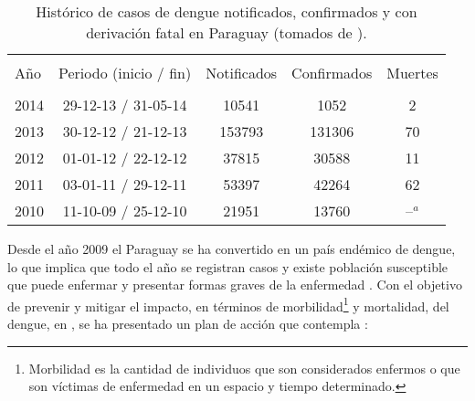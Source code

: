 \begin{table}
    \begin{minipage}{\textwidth}
        \begin{center}
        \caption{\label{tab:cap3-historico-casos-dengue} Histórico de casos de dengue notificados, confirmados y con derivación fatal en Paraguay (tomados de \citep{website:mspbsHistoria2014}).}
        \begin{tabular}{p{3cm} c c c c}
            \hline\\
            Año & Periodo (inicio / fin) & Notificados & Confirmados & Muertes\\
            \hline
            \hline\\
            2014 & 29-12-13 / 31-05-14 & 10541 & 1052 & 2\\
            2013 & 30-12-12 / 21-12-13 & 153793 & 131306 & 70\\
            2012 & 01-01-12 / 22-12-12 & 37815 & 30588 & 11\\
            2011 & 03-01-11 / 29-12-11 & 53397 & 42264 & 62\\
            2010 & 11-10-09 / 25-12-10 & 21951 & 13760 & --$^a$\\
        \end{tabular}
        \end{center}
    \end{minipage}
\end{table}


Desde el año 2009 el Paraguay se ha convertido en un país endémico de dengue, lo que implica que
todo el año se registran casos y existe población susceptible que puede enfermar y presentar
formas graves de la enfermedad \cite{planControlMspbs2014}. Con el objetivo de prevenir y mitigar
el impacto, en términos de morbilidad\footnote{Morbilidad es la cantidad de individuos que son
considerados enfermos o que son víctimas de enfermedad en un espacio y tiempo determinado.} y
mortalidad, del dengue, en \cite{planControlMspbs2014}, se ha presentado un plan de acción que
contempla :

